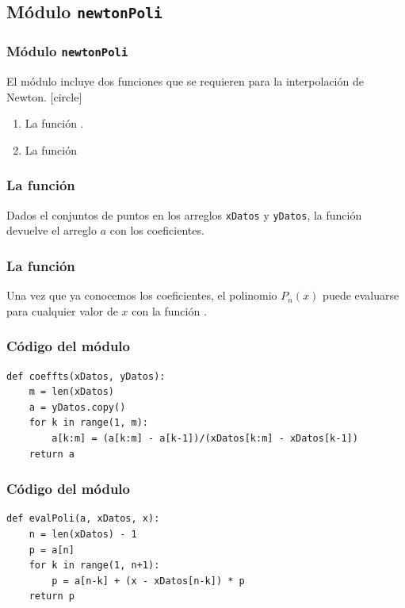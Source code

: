 \subsection{Módulo \texttt{newtonPoli}}
\begin{frame}
\frametitle{Módulo \texttt{newtonPoli}}
El módulo  incluye dos funciones que se requieren para la interpolación de Newton.
[circle]
\begin{enumerate}[<+->]
\item La función .
\item La función 
\end{enumerate}
\end{frame}
\begin{frame}
\frametitle{La función }
Dados el conjuntos de puntos en los arreglos \texttt{xDatos} y \texttt{yDatos}, la función  devuelve el arreglo $a$ con los coeficientes.
\end{frame}
\begin{frame}
\frametitle{La función }
Una vez que ya conocemos los coeficientes, el polinomio $P_{n}(x)$ puede evaluarse para cualquier valor de $x$ con la función .
\end{frame}
\begin{frame}[fragile]
\frametitle{Código del módulo}
\begin{lstlisting}[caption=Funciones \texttt{coeffts} del módulo \texttt{newtonPoli}, style=FormattedNumber, basicstyle=\linespread{1.1}\ttfamily=\small, columns=fullflexible]    
def coeffts(xDatos, yDatos):
    m = len(xDatos) 
    a = yDatos.copy()
    for k in range(1, m):
        a[k:m] = (a[k:m] - a[k-1])/(xDatos[k:m] - xDatos[k-1])
    return a
\end{lstlisting}
\end{frame}
\begin{frame}[fragile]
\frametitle{Código del módulo}
\begin{lstlisting}[caption=Funciones \texttt{evalPoli} del módulo \texttt{newtonPoli}, style=FormattedNumber, basicstyle=\linespread{1.1}\ttfamily=\small, columns=fullflexible]
def evalPoli(a, xDatos, x):
    n = len(xDatos) - 1 
    p = a[n]
    for k in range(1, n+1):
        p = a[n-k] + (x - xDatos[n-k]) * p
    return p
\end{lstlisting}
\end{frame}

